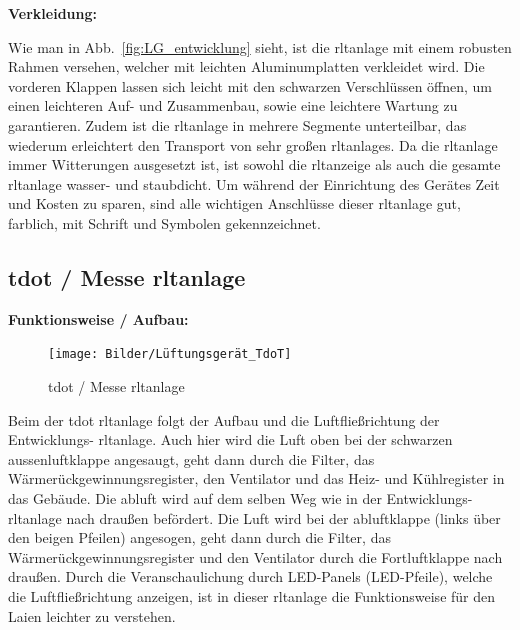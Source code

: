 \textbf{Verkleidung:}

Wie man in Abb.~\ref{fig:LG_entwicklung} sieht, ist die \ac{rltanlage} mit einem robusten Rahmen versehen, welcher mit leichten Aluminumplatten verkleidet wird. Die vorderen Klappen lassen sich leicht mit den schwarzen Verschlüssen öffnen, um einen leichteren Auf- und Zusammenbau, sowie eine leichtere Wartung zu garantieren. Zudem ist die \ac{rltanlage} in mehrere Segmente unterteilbar, das wiederum erleichtert den Transport von sehr großen \acp{rltanlage}. Da die \ac{rltanlage} immer Witterungen ausgesetzt ist, ist sowohl die \ac{rltanzeige} als auch die gesamte \ac{rltanlage} wasser- und staubdicht. Um während der Einrichtung des Gerätes Zeit und Kosten zu sparen, sind alle wichtigen Anschlüsse dieser \ac{rltanlage} gut, farblich, mit Schrift und Symbolen gekennzeichnet. 




\newpage
\subsection{\gls{tdot} / Messe \ac{rltanlage}}

\textbf{Funktionsweise / Aufbau:}
\begin{figure}[H]
	\centering
	\texttt{[image: Bilder/Lüftungsgerät\_TdoT]}
	\caption{\gls{tdot} / Messe \ac{rltanlage}} 
	\label{fig:LG_tdot}
\end{figure}

Beim der \gls{tdot} \ac{rltanlage} folgt der Aufbau und die Luftfließrichtung der Entwicklungs- \ac{rltanlage}. Auch hier wird die Luft oben bei der schwarzen \gls{aussenluft}klappe angesaugt, geht dann durch die Filter, das Wärmerückgewinnungsregister, den Ventilator und das Heiz- und Kühlregister in das Gebäude. Die \gls{abluft} wird auf dem selben Weg wie in der Entwicklungs- \ac{rltanlage} nach draußen befördert. Die Luft wird bei der \gls{abluft}klappe (links über den beigen Pfeilen) angesogen, geht dann durch die Filter, das Wärmerückgewinnungsregister und den Ventilator durch die Fortluftklappe nach draußen. Durch die Veranschaulichung durch LED-Panels (LED-Pfeile), welche die Luftfließrichtung anzeigen, ist in dieser \ac{rltanlage} die Funktionsweise für den Laien leichter zu verstehen.

